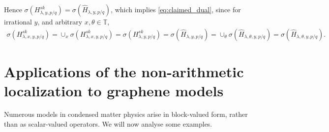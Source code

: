 \documentclass[11pt]{amsart}
\newcommand{\T}{\mathbb T}
\begin{document}
Hence $\sigma(H^{sk}_{\lambda,y,p/q})=\sigma(\widehat{H}_{\lambda,y,p/q})$, which implies \eqref{eq:claimed_dual}, since for irrational $y$, and arbitrary $x,\theta\in \T$,
\begin{align}
\sigma(H^{sk}_{\lambda,x,y,p/q})=\cup_{x}\sigma(H^{sk}_{\lambda,x,y,p/q})=\sigma(H^{sk}_{\lambda,y,p/q})=\sigma(\widehat{H}_{\lambda,y,p/q})=\cup_{\theta}\sigma(\widehat{H}_{\lambda,\theta,y,p/q})=\sigma(\widehat{H}_{\lambda,\theta,y,p/q}).
\end{align}






\section{Applications of the non-arithmetic localization to graphene models}\label{sec:application}
Numerous models in condensed matter physics arise in block-valued form, rather than as scalar-valued operators.
We will now analyse some examples. 
\end{document}

